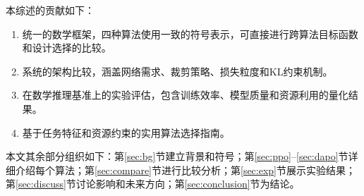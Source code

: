 本综述的贡献如下：
\begin{enumerate}[leftmargin=*, itemsep=1pt]
\item 统一的数学框架，四种算法使用一致的符号表示，可直接进行跨算法目标函数和设计选择的比较。
\item 系统的架构比较，涵盖网络需求、裁剪策略、损失粒度和KL约束机制。
\item 在数学推理基准上的实验评估，包含训练效率、模型质量和资源利用的量化结果。
\item 基于任务特征和资源约束的实用算法选择指南。
\end{enumerate}

本文其余部分组织如下：第\ref{sec:bg}节建立背景和符号；第\ref{sec:ppo}--\ref{sec:dapo}节详细介绍每个算法；第\ref{sec:compare}节进行比较分析；第\ref{sec:exp}节展示实验结果；第\ref{sec:discuss}节讨论影响和未来方向；第\ref{sec:conclusion}节为结论。
